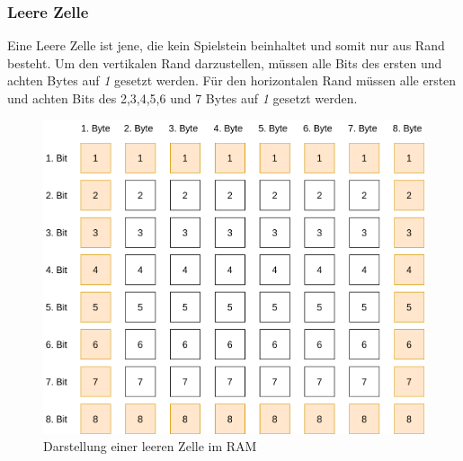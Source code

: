     \subsubsection{Leere Zelle}
        Eine Leere Zelle ist jene, die kein Spielstein beinhaltet und somit nur aus Rand besteht.
        Um den vertikalen Rand darzustellen, müssen alle Bits des ersten und achten Bytes auf \textit{1} gesetzt werden.
        Für den horizontalen Rand müssen alle ersten und achten Bits des 2,3,4,5,6 und 7 Bytes auf \textit{1} gesetzt werden.
        \begin{figure}[H]
            \centering
            \includegraphics[scale=0.25]{img/leere-zelle.png}    
            \caption{Darstellung einer leeren Zelle im RAM}
        \end{figure}

